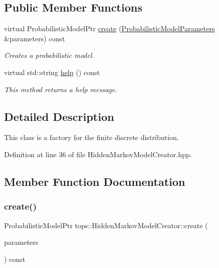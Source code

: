 \subsection*{Public Member Functions}
\begin{DoxyCompactItemize}
\item 
virtual Probabilistic\+Model\+Ptr \hyperlink{classtops_1_1HiddenMarkovModelCreator_a91a39f3246a9da001388e8de75b29964}{create} (\hyperlink{classtops_1_1ProbabilisticModelParameters}{Probabilistic\+Model\+Parameters} \&parameters) const
\begin{DoxyCompactList}\small\item\em Creates a probabilistic model. \end{DoxyCompactList}\item 
\mbox{\label{classtops_1_1HiddenMarkovModelCreator_a9c05006a5d193d6ddc7c851430a3e2b6}} 
virtual std\+::string \hyperlink{classtops_1_1HiddenMarkovModelCreator_a9c05006a5d193d6ddc7c851430a3e2b6}{help} () const
\begin{DoxyCompactList}\small\item\em This method returns a help message. \end{DoxyCompactList}\end{DoxyCompactItemize}


\subsection{Detailed Description}
This class is a factory for the finite discrete distribution. 

Definition at line 36 of file Hidden\+Markov\+Model\+Creator.\+hpp.



\subsection{Member Function Documentation}
\mbox{\label{classtops_1_1HiddenMarkovModelCreator_a91a39f3246a9da001388e8de75b29964}} 
\subsubsection{\texorpdfstring{create()}{create()}}
{\footnotesize\ttfamily Probabilistic\+Model\+Ptr tops\+::\+Hidden\+Markov\+Model\+Creator\+::create (\begin{DoxyParamCaption}\item[{\hyperlink{classtops_1_1ProbabilisticModelParameters}{Probabilistic\+Model\+Parameters} \&}]{parameters }\end{DoxyParamCaption}) const\hspace{0.3cm}{\ttfamily [virtual]}}



